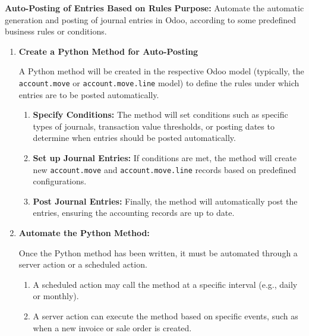 \documentclass[11pt,a4paper]{article}
\begin{document}
\noindent\textbf{Auto-Posting of Entries Based on Rules}
\textbf{Purpose:} Automate the automatic generation and posting of journal entries 
in Odoo, according to some predefined business rules or conditions.
\medskip

\begin{minipage}{0.55\textwidth}
\begin{enumerate}
    \item \textbf{Create a Python Method for Auto-Posting}

    A Python method will be created in the respective Odoo model 
    (typically, the \texttt{account.move} or \texttt{account.move.line} model) to 
    define the rules under which entries are to be posted automatically.
    \begin{enumerate}
        \item \textbf{Specify Conditions:} The method will set conditions such as 
        specific types of journals, transaction value thresholds, or posting dates 
        to determine when entries should be posted automatically.
        
        \item \textbf{Set up Journal Entries:} If conditions are met, the method 
        will create new \texttt{account.move} and \texttt{account.move.line} records 
        based on predefined configurations.
        
        \item \textbf{Post Journal Entries:} Finally, the method will automatically 
        post the entries, ensuring the accounting records are up to date.
    \end{enumerate}

    \item \textbf{Automate the Python Method:}
    
    Once the Python method has been written, it must be automated through a server action or a scheduled action.
    \begin{enumerate}
        \item A scheduled action may call the method at a specific interval (e.g., daily or monthly).
        \item A server action can execute the method based on specific events, such as when a new invoice or sale order is created.
    \end{enumerate}
\end{enumerate}

\end{minipage}%
\hfill
\end{document}
